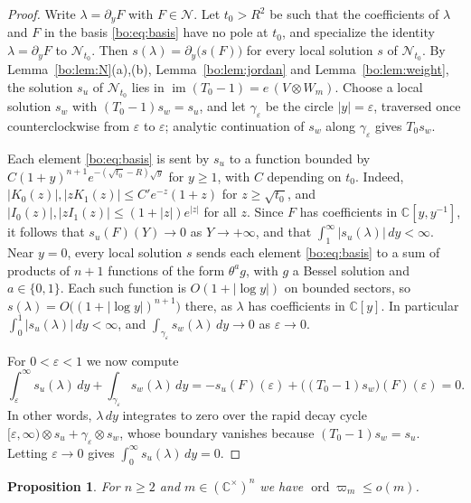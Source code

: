 \documentclass[11pt,a4paper]{article}
\newtheorem{proposition}[theorem]{Proposition}
\theoremstyle{definition}
\theoremstyle{remark}
\numberwithin{equation}{section}
\newcommand{\C}{\mathbb{C}}
\DeclareMathOperator{\ord}{ord}
\newcommand{\cN}{\mathcal{N}}
\DeclareMathOperator{\im}{im}
\begin{document}
\begin{proof}
Write $\lambda=\partial_yF$ with $F\in\cN$. Let $t_0>R^2$ be such that the coefficients of $\lambda$ and $F$ in the basis \eqref{bo:eq:basis} have no pole at $t_0$, and specialize the identity $\lambda=\partial_yF$ to $\cN_{t_0}$. Then $s(\lambda)=\partial_y\bigl(s(F)\bigr)$ for every local solution $s$ of $\cN_{t_0}$. By Lemma~\ref{bo:lem:N}(a),(b), Lemma~\ref{bo:lem:jordan} and Lemma~\ref{bo:lem:weight}, the solution $s_u$ of $\cN_{t_0}$ lies in $\im(T_0-1)=e\,(V\otimes W_m)$. Choose a local solution $s_w$ with $(T_0-1)s_w=s_u$, and let $\gamma_\varepsilon$ be the circle $|y|=\varepsilon$, traversed once counterclockwise from $\varepsilon$ to $\varepsilon$; analytic continuation of $s_w$ along $\gamma_\varepsilon$ gives $T_0s_w$.

Each element \eqref{bo:eq:basis} is sent by $s_u$ to a function bounded by $C(1+y)^{n+1}e^{-(\sqrt{t_0}-R)\sqrt y}$ for $y\ge1$, with $C$ depending on $t_0$. Indeed, $|K_0(z)|,|zK_1(z)|\le C'e^{-z}(1+z)$ for $z\ge\sqrt{t_0}$, and $|I_0(z)|,|zI_1(z)|\le(1+|z|)e^{|z|}$ for all $z$. Since $F$ has coefficients in $\C[y,y^{-1}]$, it follows that $s_u(F)(Y)\to0$ as $Y\to+\infty$, and that $\int_1^\infty|s_u(\lambda)|\,dy<\infty$. Near $y=0$, every local solution $s$ sends each element \eqref{bo:eq:basis} to a sum of products of $n+1$ functions of the form $\theta^ag$, with $g$ a Bessel solution and $a\in\{0,1\}$. Each such function is $O(1+|\log y|)$ on bounded sectors, so $s(\lambda)=O\bigl((1+|\log y|)^{n+1}\bigr)$ there, as $\lambda$ has coefficients in $\C[y]$. In particular $\int_0^1|s_u(\lambda)|\,dy<\infty$, and $\int_{\gamma_\varepsilon}s_w(\lambda)\,dy\to0$ as $\varepsilon\to0$.

For $0<\varepsilon<1$ we now compute
\[
\int_\varepsilon^\infty s_u(\lambda)\,dy+\int_{\gamma_\varepsilon}s_w(\lambda)\,dy
=-s_u(F)(\varepsilon)+\bigl((T_0-1)s_w\bigr)(F)(\varepsilon)=0 .
\]
In other words, $\lambda\,dy$ integrates to zero over the rapid decay cycle $[\varepsilon,\infty)\otimes s_u+\gamma_\varepsilon\otimes s_w$, whose boundary vanishes because $(T_0-1)s_w=s_u$. Letting $\varepsilon\to0$ gives $\int_0^\infty s_u(\lambda)\,dy=0$.
\end{proof}

\begin{proposition}\label{bo:prop:upper}
For $n\ge2$ and $m\in(\C^\times)^n$ we have $\ord\varpi_m\le o(m)$.
\end{proposition}
\end{document}
